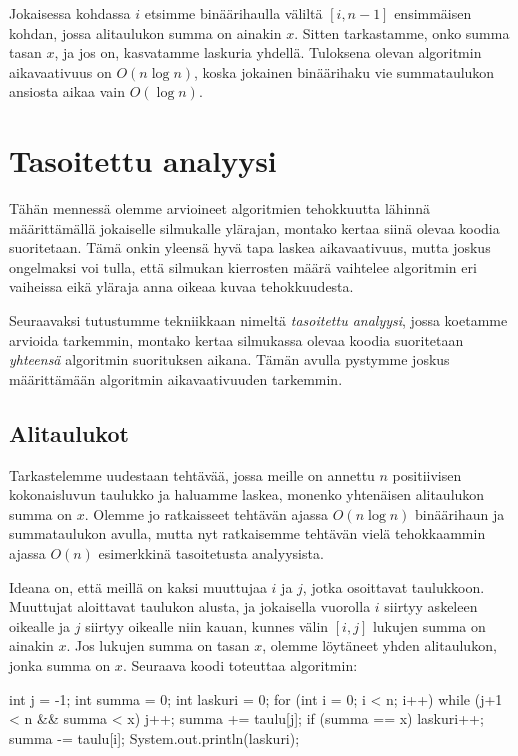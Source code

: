 Jokaisessa kohdassa $i$ etsimme binäärihaulla väliltä $[i,n-1]$
ensimmäisen kohdan, jossa alitaulukon summa on ainakin $x$.
Sitten tarkastamme, onko summa tasan $x$,
ja jos on, kasvatamme laskuria yhdellä.
Tuloksena olevan algoritmin aikavaativuus on $O(n \log n)$,
koska jokainen binäärihaku vie summataulukon ansiosta
aikaa vain $O(\log n)$.

\section{Tasoitettu analyysi}

Tähän mennessä olemme arvioineet algoritmien tehokkuutta
lähinnä määrit\-tämällä jokaiselle silmukalle ylärajan,
montako kertaa siinä olevaa koodia suoritetaan.
Tämä onkin yleensä hyvä tapa laskea aikavaativuus,
mutta joskus ongelmaksi voi tulla, että silmukan kierrosten
määrä vaihtelee algoritmin eri vaiheissa eikä yläraja
anna oikeaa kuvaa tehokkuudesta.

Seuraavaksi tutustumme tekniikkaan nimeltä
\emph{tasoitettu analyysi}, jossa koetamme arvioida tarkemmin,
montako kertaa silmukassa olevaa koodia suoritetaan
\emph{yhteensä} algoritmin suorituksen aikana.
Tämän avulla pystymme joskus määrittämään algoritmin
aikavaativuuden tarkemmin.

\subsection{Alitaulukot}

Tarkastelemme uudestaan tehtävää, jossa meille on annettu
$n$ positiivisen kokonaisluvun taulukko ja haluamme laskea,
monenko yhtenäisen alitaulukon summa on $x$.
Olemme jo ratkaisseet tehtävän ajassa $O(n \log n)$
binäärihaun ja summataulukon avulla,
mutta nyt ratkaisemme tehtävän vielä tehokkaammin
ajassa $O(n)$ esimerkkinä tasoitetusta analyysista.

Ideana on, että meillä on kaksi muuttujaa $i$ ja $j$,
jotka osoittavat taulukkoon.
Muuttujat aloittavat taulukon alusta,
ja jokaisella vuorolla $i$ siirtyy askeleen oikealle
ja $j$ siirtyy oikealle niin kauan, kunnes välin $[i,j]$
lukujen summa on ainakin $x$.
Jos lukujen summa on tasan $x$, olemme löytäneet yhden
alitaulukon, jonka summa on $x$.
Seuraava koodi toteuttaa algoritmin:

\begin{code}
int j = -1;
int summa = 0;
int laskuri = 0;
for (int i = 0; i < n; i++) {
    while (j+1 < n && summa < x) {
        j++;
        summa += taulu[j];
    }
    if (summa == x) laskuri++;
    summa -= taulu[i];
}
System.out.println(laskuri);
\end{code}

